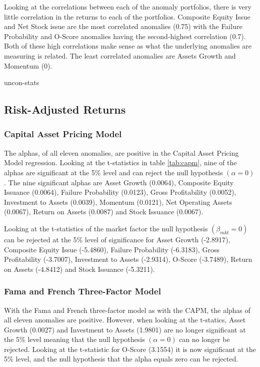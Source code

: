\documentclass[12pt, a4paper, oneside]{article}
\begin{document}
Looking at the correlations between each of the anomaly portfolios, there is very little correlation in the returns to each of the portfolios. Composite Equity Issue and Net Stock issue are the most correlated anomalies (0.75) with the Failure Probability and O-Score anomalies having the second-highest correlation (0.7). Both of these high correlations make sense as what the underlying anomalies are measuring is related. The least correlated anomalies are Assets Growth and Momentum (0).

{uncon-stats}

\subsection{Risk-Adjusted Returns}
\subsubsection{Capital Asset Pricing Model}
The alphas, of all eleven anomalies, are positive in the Capital Asset Pricing Model regression. Looking at the t-statistics in table \ref{tab:capm}, nine of the alphas are significant at the 5\% level and can reject the null hypothesis $(\alpha=0)$. The nine significant alphas are Asset Growth (0.0064), Composite Equity Issuance (0.0064), Failure Probability (0.0123), Gross Profitability (0.0052), Investment to Assets (0.0039), Momentum (0.0121), Net Operating Assets (0.0067), Return on Assets (0.0087) and Stock Issuance (0.0067).

Looking at the t-statistics of the market factor the null hypothesis $(\beta_{mkt}= 0)$ can be rejected at the 5\% level of significance for Asset Growth (-2.8917), Composite Equity Issue (-5.4860), Failure Probability (-6.3183), Gross Profitability (-3.7007), Investment to Assets (-2.9314), O-Score (-3.7489), Return on Assets (-4.8412) and Stock Issuance (-5.3211). 

\subsubsection{Fama and French Three-Factor Model}
With the Fama and French three-factor model as with the CAPM, the alphas of all eleven anomalies are positive. However, when looking at the t-statics, Asset Growth (0.0027) and Investment to Assets (1.9801) are no longer significant at the 5\% level meaning that the null hypothesis $(\alpha=0)$ can no longer be rejected. Looking at the t-statistic for O-Score (3.1554) it is now significant at the 5\% level, and the null hypothesis that the alpha equals zero can be rejected. 
\end{document}
